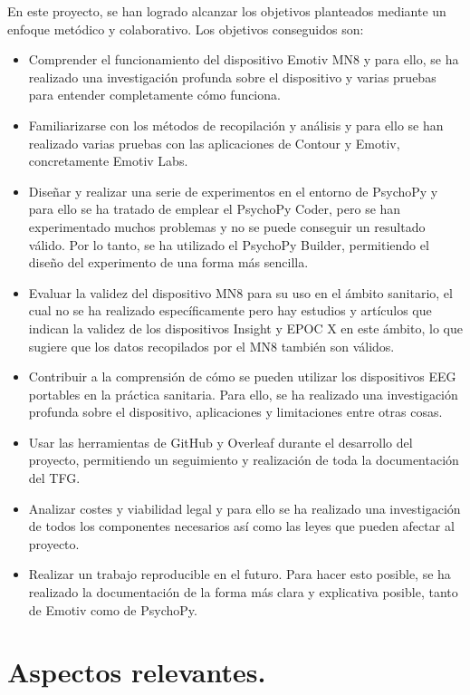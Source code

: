 
En este proyecto, se han logrado alcanzar los objetivos planteados mediante un enfoque metódico y colaborativo. Los objetivos conseguidos son:
\begin{itemize}
    \item Comprender el funcionamiento del dispositivo Emotiv MN8 y para ello, se ha realizado una investigación profunda sobre el dispositivo y varias pruebas para entender completamente cómo funciona.
    \item Familiarizarse con los métodos de recopilación y análisis y para ello se han realizado varias pruebas con las aplicaciones de Contour y Emotiv, concretamente Emotiv Labs.
    \item Diseñar y realizar una serie de experimentos en el entorno de PsychoPy y para ello se ha tratado de emplear el PsychoPy Coder, pero se han experimentado muchos problemas y no se puede conseguir un resultado válido. Por lo tanto, se ha utilizado el PsychoPy Builder, permitiendo el diseño del experimento de una forma más sencilla.
    \item Evaluar la validez del dispositivo MN8 para su uso en el ámbito sanitario, el cual no se ha realizado específicamente pero hay estudios y artículos que indican la validez de los dispositivos Insight y EPOC X en este ámbito, lo que sugiere que los datos recopilados por el MN8 también son válidos.
    \item Contribuir a la comprensión de cómo se pueden utilizar los dispositivos EEG portables en la práctica sanitaria. Para ello, se ha realizado una investigación profunda sobre el dispositivo, aplicaciones y limitaciones entre otras cosas.
    \item Usar las herramientas de GitHub y Overleaf durante el desarrollo del proyecto, permitiendo un seguimiento y realización de toda la documentación del TFG.
    \item Analizar costes y viabilidad legal y para ello se ha realizado una investigación de todos los componentes necesarios así como las leyes que pueden afectar al proyecto.
    \item Realizar un trabajo reproducible en el futuro. Para hacer esto posible, se ha realizado la documentación de la forma más clara y explicativa posible, tanto de Emotiv como de PsychoPy.
\end{itemize}

\section{Aspectos relevantes.}


